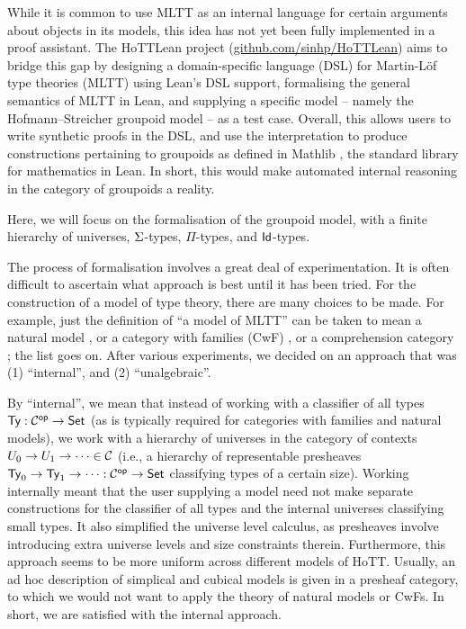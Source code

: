 While it is common to use MLTT as an internal language for
certain arguments about objects in its models,
this idea has not yet been fully implemented in a proof assistant.
The HoTTLean project \cite{hua2025, nawrocki2026, hottuf2026}
(\href{https://github.com/sinhp/HoTTLean}{github.com/sinhp/HoTTLean}) 
aims to bridge this gap by
designing a domain-specific language (DSL) for Martin-L\"of type theories (MLTT)
using Lean's DSL support,
formalising the general semantics of MLTT in Lean,
and supplying a specific model
-- namely the Hofmann--Streicher groupoid model \cite{hofmann1995} --
as a test case.
Overall, this allows users to write synthetic proofs in the DSL,
and use the interpretation to produce constructions pertaining to
groupoids as defined in Mathlib \cite{mathlib2020},
the standard library for mathematics in Lean.
In short, this would make automated internal reasoning in the category of groupoids a reality.

Here, we will focus on the formalisation of the groupoid model,
with a finite hierarchy of universes,
$\Sigma$-types, $\Pi$-types, and $\mathsf{Id}$-types.

The process of formalisation involves a great deal of experimentation.
It is often difficult to ascertain what approach is best until it has been tried.
For the construction of a model of type theory,
there are many choices to be made.
For example,
just the definition of ``a model of MLTT'' can be taken to mean
a natural model \cite{awodey2018},
or a category with families (CwF) \cite{clairambault2011},
or a comprehension category \cite{jacobs1993};
the list goes on.
After various experiments,
we decided on an approach that was (1) ``internal'',
and (2) ``unalgebraic''.


By ``internal'', we mean that instead of working with a classifier of all types $\mathsf{Ty} : \mathcal{C}^{\mathsf{op}} \to \mathsf{Set}$
(as is typically required for categories with families and natural models),
we work with a hierarchy of universes in the category of contexts
$U_0 \to U_1 \to \cdots \in \mathcal{C}$
(i.e., a hierarchy of representable presheaves $\mathsf{Ty}_0 \to \mathsf{Ty}_1 \to \cdots : \mathcal{C}^{\mathsf{op}} \to \mathsf{Set}$
classifying types of a certain size).
Working internally meant that the user supplying a model need not make separate constructions
for the classifier of all types and the internal universes classifying small types.
It also simplified the universe level calculus,
as presheaves involve introducing extra universe levels and size constraints therein.
Furthermore, this approach seems to be more uniform across different models of HoTT.
Usually, an ad hoc description of simplical and cubical models is given in a presheaf category,
to which we would not want to apply the theory of natural models or CwFs.
In short, we are satisfied with the internal approach.


